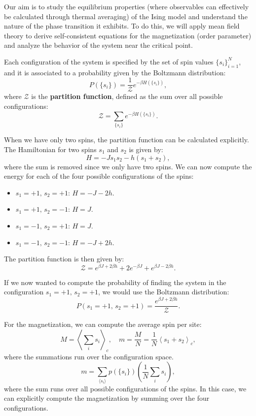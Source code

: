 Our aim is to study the equilibrium properties (where observables can effectively be calculated through thermal averaging) of the Ising model and understand the nature of the phase transition it exhibits. To do this, we will apply mean field theory to derive self-consistent equations for the magnetization (order parameter) and analyze the behavior of the system near the critical point.

Each configuration of the system is specified by the set of spin values \(\{s_i\}_{i=1}^N\), and it is associated to a probability given by the Boltzmann distribution:
\[
    P(\{s_i\}) = \frac{1}{\mathcal{Z}} e^{-\beta H(\{s_i\})},
\]
where \(\mathcal{Z}\) is the \textbf{partition function}, defined as the sum over all possible configurations:
\[
    \mathcal{Z} = \sum_{\{s_i\}} e^{-\beta H(\{s_i\})}.
\]

\begin{example}
    When we have only two spins, the partition function can be calculated explicitly. The Hamiltonian for two spins \(s_1\) and \(s_2\) is given by:
    \[
        H = - J s_1 s_2 - h (s_1 + s_2),
    \]
    where the sum is removed since we only have two spins. We can now compute the energy for each of the four possible configurations of the spins:
    \begin{itemize}
        \item \(s_1 = +1,\, s_2 = +1\): \(H = - J - 2h\).
        \item \(s_1 = +1,\, s_2 = -1\): \(H = J\).
        \item \(s_1 = -1,\, s_2 = +1\): \(H = J\).
        \item \(s_1 = -1,\, s_2 = -1\): \(H = - J + 2h\).
    \end{itemize}
    The partition function is then given by:
    \[
        \mathcal{Z} = e^{\beta J + 2\beta h} + 2 e^{-\beta J} + e^{\beta J - 2\beta h}.
    \]

    If we now wanted to compute the probability of finding the system in the configuration \(s_1 = +1,\, s_2 = +1\), we would use the Boltzmann distribution:
    \[
        P(s_1 = +1,\, s_2 = +1) = \frac{e^{\beta J + 2\beta h}}{\mathcal{Z}}.
    \]

    For the magnetization, we can compute the average spin per site:
    \[
        M = \left\langle \sum_{i} s_i \right\rangle_c, \quad m = \frac{M}{N} = \frac{1}{N} \left\langle s_1 + s_2 \right\rangle_c,
    \]
    where the summations run over the configuration space.
    \[
        m = \sum_{\langle s_i \rangle} p(\{s_i\}) \left( \frac{1}{N} \sum_{i} s_i \right),
    \]
    where the sum runs over all possible configurations of the spins. In this case, we can explicitly compute the magnetization by summing over the four configurations.
\end{example}

